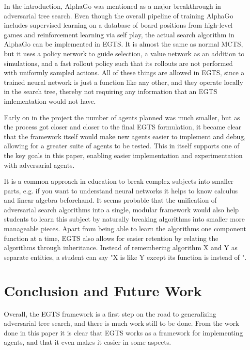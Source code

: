 In the introduction, AlphaGo was mentioned as a major breakthrough in adversarial tree search. Even though the overall pipeline of training AlphaGo includes supervised learning on a database of board positions from high-level games and reinforcement learning via self play, the actual search algorithm in AlphaGo can be implemented in EGTS. It is almost the same as normal MCTS, but it uses a policy network to guide selection, a value network as an addition to simulations, and a fast rollout policy such that its rollouts are not performed with uniformly sampled actions. All of these things are allowed in EGTS, since a trained neural network is just a function like any other, and they operate locally in the search tree, thereby not requiring any information that an EGTS imlementation would not have.

Early on in the project the number of agents planned was much smaller, but as the process got closer and closer to the final EGTS formulation, it became clear that the framework itself would make new agents easier to implement and debug, allowing for a greater suite of agents to be tested. This in itself supports one of the key goals in this paper, enabling easier implementation and experimentation with adversarial agents.

It is a common approach in education to break complex subjects into smaller parts, e.g. if you want to understand neural networks it helps to know calculus and linear algebra beforehand. It seems probable that the unification of adversarial search algorithms into a single, modular framework would also help students to learn this subject by naturally breaking algorithms into smaller more manageable pieces. Apart from being able to learn the algorithms one component function at a time, EGTS also allows for easier retention by relating the algorithms through inheritance. Instead of remembering algorithm X and Y as separate entities, a student can say "X is like Y except its \expand function is  instead of ".

\newpage
\section{Conclusion and Future Work}

Overall, the EGTS framework is a first step on the road to generalizing adversarial tree search, and there is much work still to be done. From the work done in this paper it is clear that EGTS works as a framework for implementing agents, and that it even makes it easier in some aspects. 

